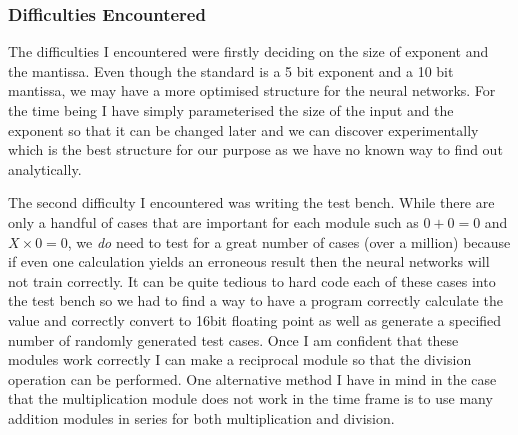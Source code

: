 \subsubsection{Difficulties Encountered}
The difficulties I encountered were firstly deciding on the size of exponent and the mantissa. Even though the standard is a 5 bit exponent and a 10 bit mantissa, we may have a more optimised structure for the neural networks. For the time being I have simply parameterised the size of the input and the exponent so that it can be changed later and we can discover experimentally which is the best structure for our purpose as we have no known way to find out analytically. \newline

The second difficulty I encountered was writing the test bench. While there are only a handful of cases that are important for each module such as $0+0=0$ and $X \times 0 = 0$, we \textit{do} need to test for a great number of cases (over a million) because if even one calculation yields an erroneous result then the neural networks will not train correctly. It can be quite tedious to hard code each of these cases into the test bench so we had to find a way to have a program correctly calculate the value and correctly convert to 16bit floating point as well as generate a specified number of randomly generated test cases. Once I am confident that these modules work correctly I can make a reciprocal module so that the division operation can be performed. One alternative method I have in mind in the case that the multiplication module does not work in the time frame is to use many addition modules in series for both multiplication and division. 